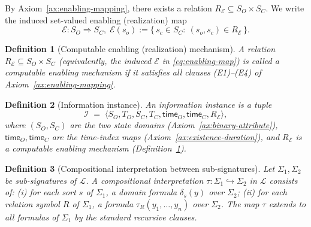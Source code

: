 \documentclass[journal]{IEEEtran}
\newcommand{\timeindex}{\mathsf{time}}
\newtheorem{definition}{Definition}[section]
\numberwithin{equation}{section}
\begin{document}
By Axiom~\ref{ax:enabling-mapping}, there exists a relation
\(R_{\mathcal E}\subseteq S_O\times S_C\).
We write the induced set-valued enabling (realization) map
\begin{equation}\label{eq:enabling-map}
  \mathcal E:S_O\Rightarrow S_C,
  \;
  \mathcal E(s_o)
  :=
  \{\,s_c\in S_C:\ (s_o,s_c)\in R_{\mathcal E}\,\}.
\end{equation}

\begin{definition}[Computable enabling (realization) mechanism]
\label{def:enabling}
A relation \(R_{\mathcal E}\subseteq S_O\times S_C\) (equivalently, the induced \(\mathcal E\) in
\eqref{eq:enabling-map}) is called a \emph{computable enabling mechanism} if it satisfies all clauses
\textup{(E1)}--\textup{(E4)} of Axiom~\ref{ax:enabling-mapping}.
\end{definition}

\begin{definition}[Information instance]
\label{def:info-instance}
An \emph{information instance} is a tuple
\[
  \mathcal I
  \;=\;
  \langle
    S_O, T_O, S_C, T_C,\timeindex_O,\timeindex_C, R_{\mathcal E}
  \rangle,
\]
where \((S_O,S_C)\) are the two state domains (Axiom~\ref{ax:binary-attribute}),
\(\timeindex_O,\timeindex_C\) are the time-index maps (Axiom~\ref{ax:existence-duration}),
and \(R_{\mathcal E}\) is a computable enabling mechanism (Definition~\ref{def:enabling}).
\end{definition}

\begin{definition}[Compositional interpretation between sub-signatures]
\label{def:comp-interp}
Let \(\Sigma_1,\Sigma_2\) be sub-signatures of \(\mathcal{L}\).
A \emph{compositional interpretation} \(\tau:\Sigma_1\hookrightarrow\Sigma_2\) in \(\mathcal{L}\) consists of:
\textup{(i)} for each sort \(s\) of \(\Sigma_1\), a domain formula \(\delta_s(y)\) over \(\Sigma_2\);
\textup{(ii)} for each relation symbol \(R\) of \(\Sigma_1\), a formula \(\tau_R(y_1,\ldots,y_n)\) over \(\Sigma_2\).
The map \(\tau\) extends to all formulas of \(\Sigma_1\) by the standard recursive clauses.
\end{definition}
\end{document}
